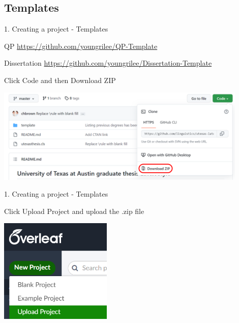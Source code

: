 \documentclass[13pt]{beamer}
\newcommand{\itemA}{\item[\textcolor{black}{\textbullet}]}
\newcommand{\itemB}{\item[\textcolor{black}{\textopenbullet}]}
\newcommand{\green}{\textcolor{colorgreen}}
\begin{document}
\subsection{Templates}
\begin{frame}{1. Creating a project - Templates} 

 \begin{fullpageitemize}
    \itemA QP
    \green{\scriptsize{\url{https://github.com/youngrilee/QP-Template}}}
    \itemA Dissertation \green{\scriptsize{\url{https://github.com/youngrilee/Dissertation-Template}}}\hfill \break
    \begin{fullpageitemize}
    \itemB Click \green{Code} and then \green{Download ZIP}
    \end{fullpageitemize}
    \includegraphics[width=0.9\textwidth,keepaspectratio]{images/git_download.png}
 \end{fullpageitemize}
 
\end{frame}

\begin{frame}{1. Creating a project - Templates} 

 \begin{fullpageitemize}
    \itemA  Click \green{Upload Project} and upload the .zip file \hfill \break 
    
    \includegraphics[width=0.4\textwidth,keepaspectratio]{images/upload_proj.png}
 \end{fullpageitemize}
 
\end{frame}
\end{document}
